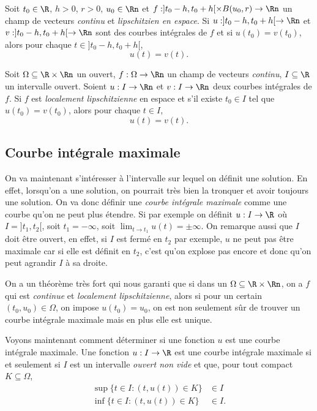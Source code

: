 \begin{myprop}
  Soit $t_0 \in \R$, $h > 0$, $r > 0$, $u_0 \in \Rn$ et
  $f:]t_0-h,t_0+h[ \times B(u_0,r) \to \Rn$ un champ de vecteurs
  \emph{continu} et \emph{lipschitzien en espace}.
  Si $u:]t_0-h,t_0+h[\to\Rn$ et $v:]t_0-h,t_0+h[\to\Rn$ sont des courbes
  intégrales de $f$ et si $u(t_0) = v(t_0)$, alors pour chaque
  $t \in ]t_0-h,t_0+h[$,
  \[ u(t) = v(t). \]
\end{myprop}
\begin{myprop}
  Soit $\Omega \subseteq \R\times\Rn$ un ouvert,
  $f: \Omega\to \Rn$ un champ de vecteurs \emph{continu},
  $I \subseteq \R$ un intervalle ouvert.
  Soient $u:I\to \Rn$ et $v:I \to \Rn$ deux courbes intégrales de $f$.
  Si $f$ est \emph{localement lipschitzienne} en espace
  et s'il existe $t_0 \in I$
  tel que $u(t_0) = v(t_0)$, alors pour chaque $t \in I$,
  \[ u(t) = v(t). \]
\end{myprop}

\subsection{Courbe intégrale maximale}
On va maintenant s'intéresser à l'intervalle
sur lequel on définit une solution.
En effet, lorsqu'on a une solution,
on pourrait très bien la tronquer et avoir toujours une solution.
On va donc définir une \emph{courbe intégrale maximale} comme une courbe
qu'on ne peut plus étendre.
Si par exemple on définit $u:I\to\R$ où $I = ]t_1,t_2[$,
soit $t_1 = -\infty$, soit $\lim_{t\to t_1} u(t) = \pm\infty$.
On remarque aussi que $I$ doit être ouvert, en effet, si $I$ est fermé en
$t_2$ par exemple, $u$ ne peut pas être maximale car si elle est définit en
$t_2$, c'est qu'on explose pas encore et donc qu'on peut agrandir $I$
à sa droite.

On a un théorème très fort qui nous garanti que si dans
un $\Omega \subseteq \R\times\Rn$, on a $f$ qui est \emph{continue}
et \emph{localement lipschitzienne},
alors si pour un certain $(t_0, u_0) \in \Omega$, on impose
$u(t_0) = u_0$, on est non seulement sûr de trouver un courbe intégrale
maximale mais en plus elle est unique.

Voyons maintenant comment déterminer si une fonction $u$ est une
courbe intégrale maximale.
Une fonction $u:I\to\R$ est une courbe intégrale maximale
si et seulement si
$I$ est un intervalle \emph{ouvert non vide} et que,
pour tout compact $K \subseteq \Omega$,
\begin{align*}
  \sup\{t \in I: (t, u(t)) \in K\} & \in I\\
  \inf\{t \in I: (t, u(t)) \in K\} & \in I.
\end{align*}

